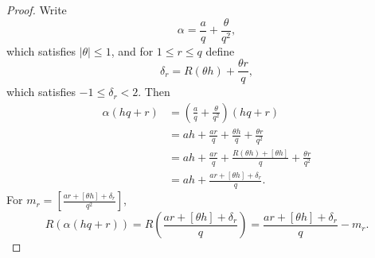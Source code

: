 \documentclass{amsart}
\begin{document}
\begin{proof}
Write
\[
\alpha = \frac{a}{q}+\frac{\theta}{q^2},
\]
which satisfies $|\theta| \leq 1$, and for $1 \leq r \leq q$ define
\[
\delta_r = R(\theta h)+\frac{\theta r}{q},
\]
which satisfies $-1 \leq \delta_r < 2$. Then
\begin{align*}
\alpha(hq+r)&= \left(\frac{a}{q}+\frac{\theta}{q^2}\right)(hq+r)\\
&=ah+\frac{ar}{q}+\frac{\theta h}{q}+\frac{\theta r}{q^2}\\
&=ah+\frac{ar}{q} + \frac{R(\theta h)+[\theta h]}{q}+\frac{\theta r}{q^2}\\
&=ah+\frac{ar+[\theta h]+\delta_r}{q}.
\end{align*}
For $m_r = \left[ \frac{ar+[\theta h]+\delta_r}{q^2} \right]$, 
\[
R(\alpha(hq+r)) = R\left( \frac{ar+[\theta h]+\delta_r}{q}\right) = \frac{ar+[\theta h]+\delta_r}{q} - m_r.
\]


\end{proof}
\end{document}
